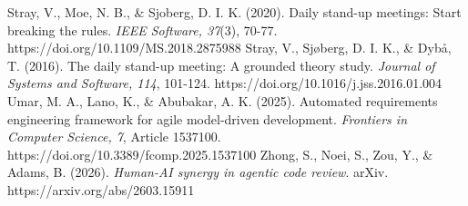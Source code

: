 \documentclass[11pt]{article}
\begin{document}
Stray, V., Moe, N. B., \& Sjoberg, D. I. K. (2020). Daily stand-up meetings: Start breaking the rules. \emph{IEEE Software, 37}(3), 70-77. https://doi.org/10.1109/MS.2018.2875988
Stray, V., Sjøberg, D. I. K., \& Dybå, T. (2016). The daily stand-up meeting: A grounded theory study. \emph{Journal of Systems and Software, 114}, 101-124. https://doi.org/10.1016/j.jss.2016.01.004
Umar, M. A., Lano, K., \& Abubakar, A. K. (2025). Automated requirements engineering framework for agile model-driven development. \emph{Frontiers in Computer Science, 7}, Article 1537100. https://doi.org/10.3389/fcomp.2025.1537100
Zhong, S., Noei, S., Zou, Y., \& Adams, B. (2026). \emph{Human-AI synergy in agentic code review}. arXiv. https://arxiv.org/abs/2603.15911
\end{document}
